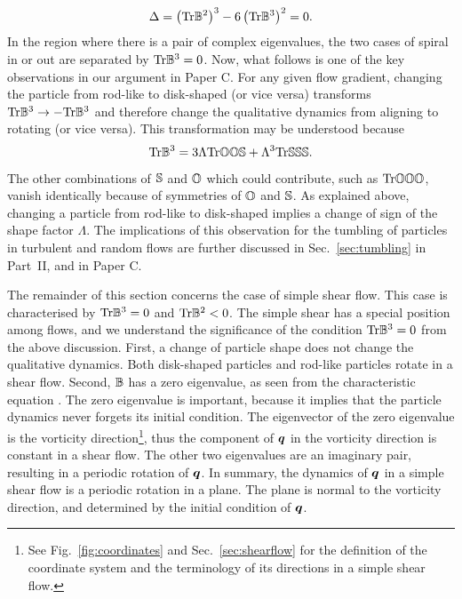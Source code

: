 \documentclass[thesis.tex]{subfiles}
\begin{document}
\begin{align*}
 	\Delta = \left(\mbox{Tr} \mathbb{B}^2\right)^3 - 6\left(\mbox{Tr} \mathbb{B}^3\right)^2 = 0.
 \end{align*} 
In the region where there is a pair of complex eigenvalues, the two cases of spiral in or out are separated by $\mbox{Tr} \mathbb{B}^3=0$. Now, what follows is one of the key observations in our argument in Paper C. For any given flow gradient, changing the particle from rod-like to disk-shaped (or vice versa) transforms $\mbox{Tr} \mathbb{B}^3\to-\mbox{Tr}\mathbb{B}^3$ and therefore change the qualitative dynamics from aligning to rotating (or vice versa). This transformation may be understood because
\begin{align*}
	\mbox{Tr} \mathbb{B}^3 = 3\Lambda \mbox{Tr} \mathbb{O}\mathbb{O} \mathbb{S} + \Lambda^3 \mbox{Tr} \mathbb{S}\mathbb{S} \mathbb{S}.
\end{align*}
The other combinations of $\mathbb{S}$ and $\mathbb{O}$ which could contribute, such as $\mbox{Tr} \mathbb{O}\mathbb{O} \mathbb{O}$, vanish identically because of symmetries of $\mathbb{O}$ and $\mathbb{S}$. As explained above, changing a particle from rod-like to disk-shaped implies a change of sign of the shape factor $\Lambda$. The implications of this observation for the tumbling of particles in turbulent and random flows are further discussed in Sec.~\ref{sec:tumbling} in Part~II, and in Paper C. 

The remainder of this section concerns the case of simple shear flow. This case is characterised by $\mbox{Tr} \mathbb{B}^3=0$ and $\mbox{Tr} \mathbb{B}^2<0$. The simple shear has a special position among flows, and we understand the significance of the condition $\mbox{Tr}\mathbb{B}^3=0$ from the above discussion. First, a change of particle shape does not change the qualitative dynamics. Both disk-shaped particles and rod-like particles rotate in a shear flow. Second, $\mathbb{B}$ has a zero eigenvalue, as seen from the characteristic equation . The zero eigenvalue is important, because it implies that the particle dynamics never forgets its initial condition. The eigenvector of the zero eigenvalue is the vorticity direction\footnote{See Fig.~\ref{fig:coordinates} and Sec.~\ref{sec:shearflow} for the definition of the coordinate system and the terminology of its directions in a simple shear flow.}, thus the component of $\mbox{\boldmath$q$}$ in the vorticity direction is constant in a shear flow. The other two eigenvalues are an imaginary pair, resulting in a periodic rotation of $\mbox{\boldmath$q$}$. In summary, the dynamics of $\mbox{\boldmath$q$}$ in a simple shear flow is a periodic rotation in a plane. The plane is normal to the vorticity direction, and determined by the initial condition of $\mbox{\boldmath$q$}$.
\end{document}
